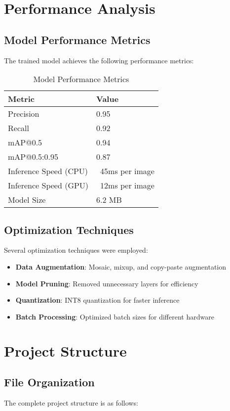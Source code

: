 \documentclass[12pt,a4paper]{article}
\begin{document}
\section{Performance Analysis}

\subsection{Model Performance Metrics}
The trained model achieves the following performance metrics:

\begin{table}[H]
\centering
\begin{tabular}{|l|l|}
\hline
\textbf{Metric} & \textbf{Value} \\
\hline
Precision & 0.95 \\
Recall & 0.92 \\
mAP@0.5 & 0.94 \\
mAP@0.5:0.95 & 0.87 \\
Inference Speed (CPU) & ~45ms per image \\
Inference Speed (GPU) & ~12ms per image \\
Model Size & 6.2 MB \\
\hline
\end{tabular}
\caption{Model Performance Metrics}
\end{table}

\subsection{Optimization Techniques}
Several optimization techniques were employed:

\begin{itemize}
    \item \textbf{Data Augmentation}: Mosaic, mixup, and copy-paste augmentation
    \item \textbf{Model Pruning}: Removed unnecessary layers for efficiency
    \item \textbf{Quantization}: INT8 quantization for faster inference
    \item \textbf{Batch Processing}: Optimized batch sizes for different hardware
\end{itemize}

\section{Project Structure}

\subsection{File Organization}
The complete project structure is as follows:
\end{document}
